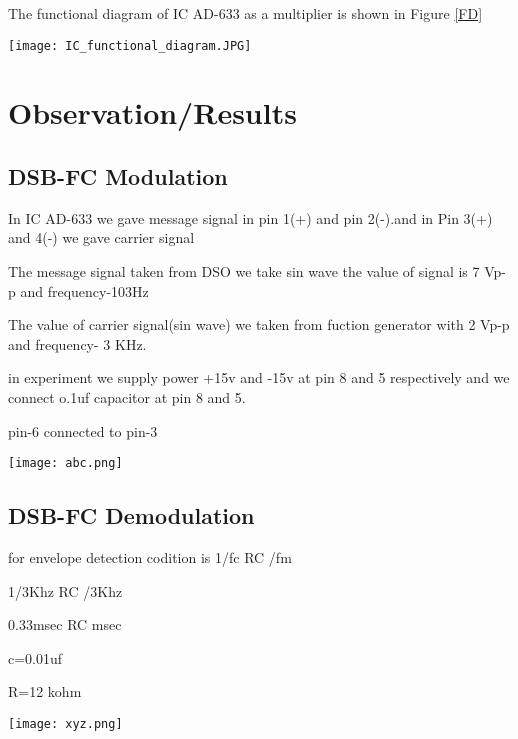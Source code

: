 \documentclass{article}
\begin{document}
 
The functional diagram of IC AD-633 as a multiplier is shown in Figure \ref{FD}
\begin{figure*}[ht]
	\centering
	\texttt{[image: IC\_functional\_diagram.JPG]}
	\caption{Functional diagram of IC AD-633 as a multiplier}
	\label{FD}
\end{figure*}









\section{Observation/Results}
\subsection{DSB-FC Modulation}
In IC AD-633 we gave message signal in pin 1(+) and pin 2(-).and in Pin 3(+) and 4(-) we gave carrier signal\par
The  message signal taken from DSO we take sin wave the value of signal is 7 Vp-p and frequency-103Hz\par
The value of carrier signal(sin wave) we taken from fuction generator with 2 Vp-p and frequency- 3 KHz.\par
in experiment we supply power +15v and -15v at pin 8 and 5 respectively and we connect o.1uf capacitor at pin 8 and 5.\par
pin-6 connected to pin-3\par
\begin{figure*}[ht]
	\centering
	\texttt{[image: abc.png]}
	\caption{Waveform on DSO for DSB-FC modulated signal}
	\label{dsbsc}
\end{figure*}


\subsection{DSB-FC Demodulation}
for envelope detection codition is 1/fc \ll RC /fm \par 
1/3Khz  \ll RC  /3Khz \par
0.33msec  \ll RC   msec \par
c=0.01uf\par
R=12 kohm
\begin{figure*}[ht]
	\centering
	\texttt{[image: xyz.png]}
	\caption{Waveform after demodulation on DSO}
	\label{dsbsc}
\end{figure*}
\end{document}
